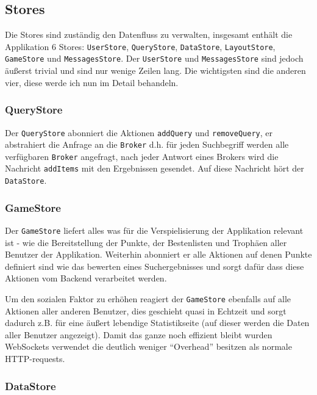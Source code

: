 \documentclass[12pt,twoside]{book}
\begin{document}
\subsection{Stores}

Die Stores sind zuständig den Datenfluss zu verwalten, insgesamt enthält die Applikation 6 Stores: \texttt{UserStore}, \texttt{QueryStore}, \texttt{DataStore}, \texttt{LayoutStore}, \texttt{GameStore} und \texttt{MessagesStore}.
Der \texttt{UserStore} und \texttt{MessagesStore} sind jedoch äußerst trivial und sind nur wenige Zeilen lang. Die wichtigsten sind die anderen vier, diese werde ich nun im Detail behandeln.

\subsubsection*{QueryStore}

Der \texttt{QueryStore} abonniert die Aktionen \texttt{addQuery} und \texttt{removeQuery}, er abstrahiert die Anfrage an die \texttt{Broker} d.h. für jeden Suchbegriff werden alle verfügbaren \texttt{Broker} angefragt, nach jeder Antwort eines Brokers wird die Nachricht \texttt{addItems} mit den Ergebnissen gesendet. Auf diese Nachricht hört der \texttt{DataStore}.

\subsubsection*{GameStore}

Der \texttt{GameStore} liefert alles was für die Verspielisierung der Applikation relevant ist - wie die Bereitstellung der Punkte, der Bestenlisten und Trophäen aller Benutzer der Applikation. Weiterhin abonniert er alle Aktionen auf denen Punkte definiert sind wie das bewerten eines Suchergebnisses und sorgt dafür dass diese Aktionen vom Backend verarbeitet werden.

Um den sozialen Faktor zu erhöhen reagiert der \texttt{GameStore} ebenfalls auf alle Aktionen aller anderen Benutzer, dies geschieht quasi in Echtzeit und sorgt dadurch z.B. für eine äußert lebendige Statistikseite (auf dieser werden die Daten aller Benutzer angezeigt).
Damit das ganze noch effizient bleibt wurden WebSockets verwendet die deutlich weniger ``Overhead'' besitzen als normale HTTP-requests.

\subsubsection*{DataStore}
\end{document}
